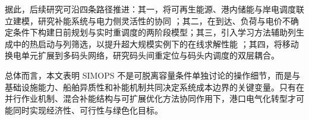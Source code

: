\documentclass[UTF8, a4paper, 12pt]{ctexart}
\theoremstyle{plain}
\theoremstyle{definition}
\theoremstyle{remark}
\begin{document}
据此，后续研究可沿四条路径推进：其一，将可再生能源、港内储能与岸电调度联立建模，研究补能系统与电力侧灵活性的协同 \cite{Li2022_BSS}；其二，在到达、负荷与电价不确定条件下构建日前规划与实时重调度的两阶段模型；其三，引入学习方法辅助列生成中的热启动与列筛选，以提升超大规模实例下的在线求解性能 \cite{Bengio2021}；其四，将移动换电单元扩展到多码头网络，研究码头间重定位与码头内调度的双层耦合。

总体而言，本文表明 SIMOPS 不是可脱离容量条件单独讨论的操作细节，而是与基础设施能力、船舶异质性和补能机制共同决定系统成本边界的关键变量。只有在并行作业机制、混合补能结构与可扩展优化方法协同作用下，港口电气化转型才可能同时实现经济性、可行性与绿色化目标。

\FloatBarrier


\end{document}
